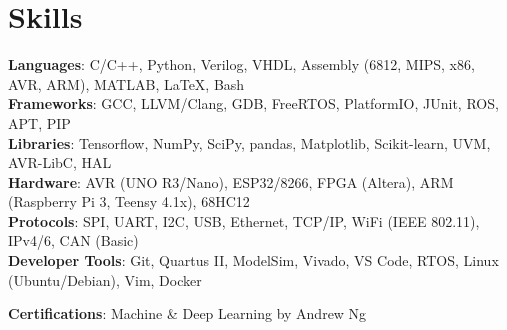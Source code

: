 

\section{Skills}
 \begin{itemize}[leftmargin=0.15in, label={}]
    \small{\item{
     \textbf{Languages}{: C/C++, Python, Verilog, VHDL, Assembly (6812, MIPS, x86, AVR, ARM), MATLAB, \LaTeX, Bash} \\
     \textbf{Frameworks}{: GCC, LLVM/Clang, GDB, FreeRTOS, PlatformIO, JUnit, ROS, APT, PIP} \\
     \textbf{Libraries}{: Tensorflow, NumPy, SciPy, pandas, Matplotlib, Scikit-learn, UVM, AVR-LibC, HAL} \\
     \textbf{Hardware}{: AVR (UNO R3/Nano), ESP32/8266, FPGA (Altera), ARM (Raspberry Pi 3, Teensy 4.1x), 68HC12} \\
     \textbf{Protocols}{: SPI, UART, I2C, USB, Ethernet, TCP/IP, WiFi (IEEE 802.11), IPv4/6, CAN (Basic)} \\
     \textbf{Developer Tools}{: Git, Quartus II, ModelSim, Vivado, VS Code, RTOS, Linux (Ubuntu/Debian), Vim, Docker} \\
    }}
    \textbf{Certifications}{: Machine \& Deep Learning by Andrew Ng}
    \spaceReducerMini
 \end{itemize}

 